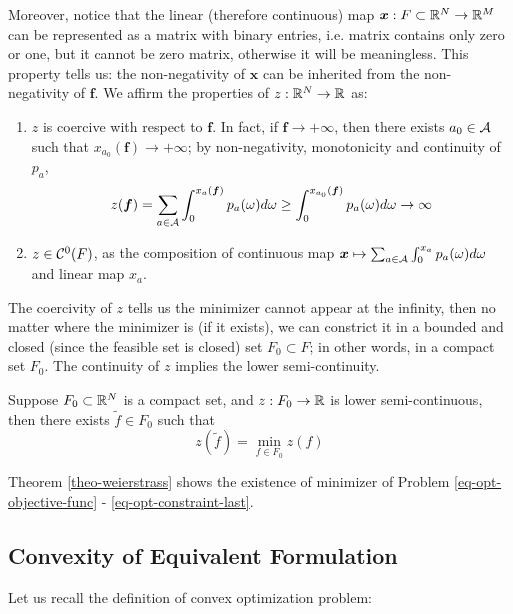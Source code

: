 \documentclass{article}
\begin{document}
Moreover, notice that the linear (therefore continuous) map $ \boldsymbol{x} : F \subset \mathbb{R}^N \rightarrow \mathbb{R}^M $ can be represented as a matrix with binary entries, i.e. matrix contains only zero or one, but it cannot be zero matrix, otherwise it will be meaningless. This property tells us: the non-negativity of $ \boldsymbol{x} $ can be inherited from the non-negativity of $ \boldsymbol{f} $. We affirm the properties of $ z : \mathbb{R}^N \rightarrow \mathbb{R} $ as:
\begin{enumerate}
    \item $ z $ is coercive with respect to $ \boldsymbol{f} $. In fact, if $ \boldsymbol{f} \rightarrow +\infty $, then there exists $ a_0 \in \mathcal{A} $ such that $ x_{a_0} (\boldsymbol{f}) \rightarrow + \infty $; by non-negativity, monotonicity and continuity of $ p_a $, 
    $$ z (\boldsymbol{f}) = \sum_{a \in \mathcal{A}} \int_0^{x_a (\boldsymbol{f})} p_a (\omega) d \omega \ge \int_0^{x_{a_0} (\boldsymbol{f})} p_a (\omega) d \omega \rightarrow \infty $$ 
    \item $ z \in \mathcal{C}^0 (F) $, as the composition of continuous map $ \boldsymbol{x} \mapsto \sum_{a \in \mathcal{A}} \int_0^{x_a} p_a (\omega) d \omega $ and linear map $ x_a $.
\end{enumerate}

The coercivity of $ z $ tells us the minimizer cannot appear at the infinity, then no matter where the minimizer is (if it exists), we can constrict it in a bounded and closed (since the feasible set is closed) set $ F_0 \subset F $; in other words, in a compact set $ F_0 $. The continuity of $ z $ implies the lower semi-continuity. 

\begin{theo} [Weierstrass] \label{theo-weierstrass}
    Suppose $ F_0 \subset \mathbb{R}^N $ is a compact set, and $ z : F_0 \rightarrow \mathbb{R} $ is lower semi-continuous, then there exists $ \tilde{f} \in F_0 $ such that 
    $$ z(\tilde{f}) = \min_{f \in F_0} z(f) $$
\end{theo}

Theorem \ref{theo-weierstrass} shows the existence of minimizer of Problem \ref{eq-opt-objective-func} - \ref{eq-opt-constraint-last}.

\subsection{Convexity of Equivalent Formulation}

Let us recall the definition of convex optimization problem:
\end{document}
